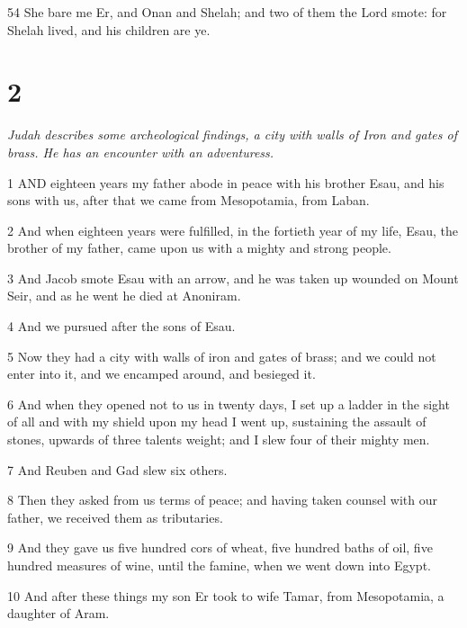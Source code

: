 \par 54 She bare me Er, and Onan and Shelah; and two of them the Lord smote: for Shelah lived, and his children are ye.

\chapter{2}

\par \textit{Judah describes some archeological findings, a city with walls of Iron and gates of brass. He has an encounter with an adventuress.}

\par 1 AND eighteen years my father abode in peace with his brother Esau, and his sons with us, after that we came from Mesopotamia, from Laban.

\par 2 And when eighteen years were fulfilled, in the fortieth year of my life, Esau, the brother of my father, came upon us with a mighty and strong people.

\par 3 And Jacob smote Esau with an arrow, and he was taken up wounded on Mount Seir, and as he went he died at Anoniram.

\par 4 And we pursued after the sons of Esau.

\par 5 Now they had a city with walls of iron and gates of brass; and we could not enter into it, and we encamped around, and besieged it.

\par 6 And when they opened not to us in twenty days, I set up a ladder in the sight of all and with my shield upon my head I went up, sustaining the assault of stones, upwards of three talents weight; and I slew four of their mighty men.

\par 7 And Reuben and Gad slew six others.

\par 8 Then they asked from us terms of peace; and having taken counsel with our father, we received them as tributaries.

\par 9 And they gave us five hundred cors of wheat, five hundred baths of oil, five hundred measures of wine, until the famine, when we went down into Egypt.

\par 10 And after these things my son Er took to wife Tamar, from Mesopotamia, a daughter of Aram.

